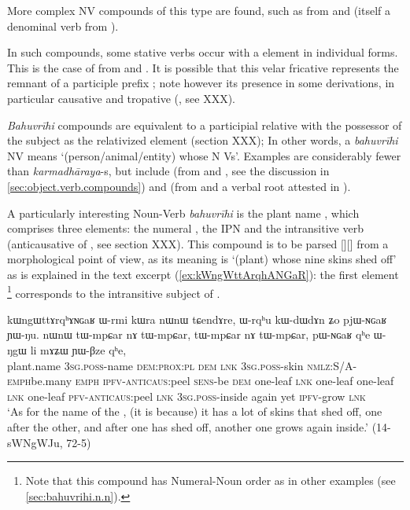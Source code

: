 More complex NV compounds of this type are found, such as  from  and  (itself a denominal verb from ).

In such compounds, some stative verbs occur with a  element in individual forms. This is the case of  from  and . It is possible that this velar fricative represents the remnant of a participle prefix ; note however its presence in some derivations, in particular causative and tropative (, see XXX).
 
\textit{Bahuvrīhi} compounds are equivalent to a participial relative with the possessor of the subject as the relativized element (section XXX); In other words, a \textit{bahuvrīhi} NV means `(person/animal/entity) whose N Vs'. Examples are considerably fewer than \textit{karmadhāraya}-s, but include  (from  and , see the discussion in \ref{sec:object.verb.compounds}) and   (from  and a verbal root   attested in ). 
 
A particularly interesting Noun-Verb \textit{bahuvrīhi} is the plant name , which comprises three elements: the numeral , the IPN  and the intransitive verb  (anticausative of , see section XXX). This compound is to be parsed [][] from a morphological point of view, as its meaning is `(plant) whose nine skins shed off' as is explained in the text excerpt (\ref{ex:kWngWttArqhANGaR}): the first element \footnote{Note that this compound has Numeral-Noun order as in other examples (see \ref{sec:bahuvrihi.n.n}).} corresponds to the intransitive subject of . 

\begin{exe}
\ex \label{ex:kWngWttArqhANGaR}
\gll kɯngɯttɤrqʰɤɴɢaʁ ɯ-rmi kɯra nɯnɯ tɕendɤre, ɯ-rqʰu kɯ-dɯ\redp{}dɤn ʑo pjɯ-ɴɢaʁ ɲɯ-ŋu. nɯnɯ tɯ-mpɕar nɤ tɯ-mpɕar, tɯ-mpɕar nɤ tɯ-mpɕar, pɯ-ɴɢaʁ qʰe ɯ-ŋgɯ li mɤʑɯ ɲɯ-βze qʰe, \\
plant.name \textsc{3sg.poss}-name \textsc{dem:prox:pl} \textsc{dem} \textsc{lnk} \textsc{3sg.poss}-skin \textsc{nmlz}:S/A-\textsc{emph}\redp{}be.many \textsc{emph} \textsc{ipfv}-\textsc{anticaus}:peel \textsc{sens}-be \textsc{dem} one-leaf \textsc{lnk}  one-leaf  one-leaf \textsc{lnk}  one-leaf \textsc{pfv}-\textsc{anticaus}:peel \textsc{lnk} \textsc{3sg.poss}-inside again yet \textsc{ipfv}-grow \textsc{lnk}  \\
\glt `As for the name of the , (it is because) it has a lot of skins that shed off, one after the other, and after one has shed off, another one grows again inside.' (14-sWNgWJu, 72-5)
\end{exe}

